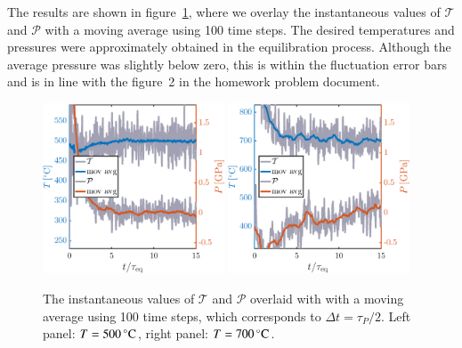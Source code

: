The results are shown in figure~\ref{fig:eq}, where we overlay the instantaneous values of $\mathcal{T}$ and $\mathcal{P}$ with a moving average using 100 time steps. The desired temperatures and pressures were approximately obtained in the equilibration process. Although  the average pressure was slightly below zero, this is within the fluctuation error bars and is in line with the figure~2 in the homework problem document. 
\begin{figure}[!ht]
\begin{center}
  \includegraphics[width=0.48\textwidth]{../figures/TP-eq-500} 
    \includegraphics[width=0.48\textwidth]{../figures/TP-eq-700} 
  \caption{The instantaneous values of $\mathcal{T}$ and $\mathcal{P}$ overlaid with with a moving average using 100 time steps, which corresponds to $\Delta t = \tau_P/2$. Left panel: $T=\unit[500]{^\circ C}$,  right panel: $T=\unit[700]{^\circ C}$.}
  \label{fig:eq}
\end{center}
\end{figure}

